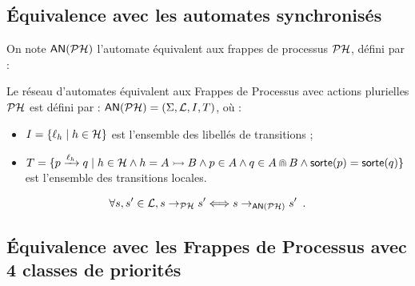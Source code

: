 \subsection{Équivalence avec les automates synchronisés}

On note $\mathsf{AN}(\mathcal{PH})$ l'automate équivalent aux frappes de processus $\mathcal{PH}$, défini par :

\begin{definition}
  Le réseau d'automates équivalent aux Frappes de Processus avec actions plurielles $\mathcal{PH}$
  est défini par : $\mathsf{AN}(\mathcal{PH}) = (\Sigma, \mathcal{L}, I, T)$, où :
  \begin{itemize}
    \item $I = \{ \ell_h \mid h \in \mathcal{H} \}$ est l'ensemble des libellés de transitions ;
    \item $T = \{ p \xrightarrow{\ell_h} q \mid
      h \in \mathcal{H} \wedge h = \mbox{$A \rightarrowtail B$} \wedge p \in A \wedge q \in A \Cap B \wedge
      \mathsf{sorte}(p) = \mathsf{sorte}(q) \}$ est l'ensemble des transitions locales.
  \end{itemize}
\end{definition}


\begin{theorem}[$\PH \approx \phmtoan$]
  \[\forall s, s' \in \mathcal{L}, s \rightarrow_{\mathcal{PH}} s' \Longleftrightarrow s \rightarrow_{\mathsf{AN}(\mathcal{PH})} s' \enspace.\]
\end{theorem}




\subsection{Équivalence avec les Frappes de Processus avec 4 classes de priorités}

